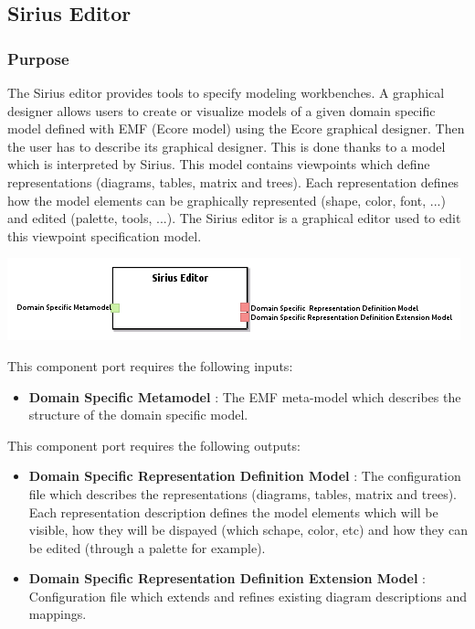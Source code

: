\documentclass{gemoc} %
\begin{document}
\subsection{Sirius Editor}

\subsubsection{Purpose}
The Sirius editor provides tools to specify modeling workbenches. A graphical designer allows users to create or visualize models of a given domain specific model defined with EMF (Ecore model) using the Ecore graphical designer. Then the user has to describe its graphical designer. This is done thanks to a model which is interpreted by Sirius. This model contains viewpoints which define representations (diagrams, tables, matrix and trees). Each representation defines how the model elements can be graphically represented (shape, color, font, ...) and edited (palette, tools, ...).
The Sirius editor is a graphical editor used to edit this viewpoint specification model.
\begin{center}
\includegraphics*[trim=0.0cm 0.0cm 0cm 0.0cm, clip=true]{../images/generated/Generated_Sirius_Editor.png}
\end{center}

This component port requires the following inputs:
\begin{itemize}
  \item \textbf{Domain Specific Metamodel} :
The EMF meta-model which describes the structure of the domain specific model.
\end{itemize}

This component port requires the following outputs:
\begin{itemize}
  \item \textbf{Domain Specific  Representation Definition Model} :
The configuration file which describes the representations (diagrams, tables, matrix and trees). Each representation description defines the model elements which will be visible, how they will be dispayed (which schape, color, etc) and how they can be edited (through a palette for example).
  \item \textbf{Domain Specific Representation Definition Extension Model} :
Configuration file which extends and refines existing diagram descriptions and mappings.
\end{itemize}
\end{document}
